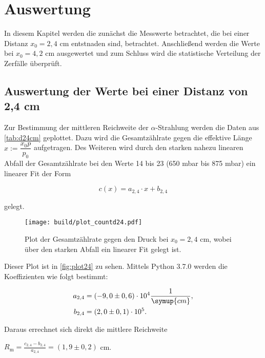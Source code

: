 \section{Auswertung}
\label{sec:Auswertung}

In diesem Kapitel werden die zunächst die Messwerte betrachtet, die bei einer Distanz $x_0 = 2,4$ cm entstnaden sind, betrachtet.
Anschließend werden die Werte bei $x_0 = 4,2$ cm ausgewertet und zum Schluss wird die statistische Verteilung der Zerfälle überprüft.

\subsection{Auswertung der Werte bei einer Distanz von 2,4 cm}

Zur Bestimmung der mittleren Reichweite der $\alpha$-Strahlung werden die Daten aus \autoref{tab:d24cm} geplottet.
Dazu wird die Gesamtzählrate gegen die effektive Länge $x := \dfrac{x_0 p}{p_0}$ aufgetragen.
Des Weiteren wird durch den starken nahezu linearen Abfall der Gesamtzählrate bei den Werte 14 bis 23 (650 mbar bis 875 mbar) ein linearer Fit der Form

\begin{equation}
    c(x) = a_{2,4} \cdot x + b_{2,4}
\end{equation}

gelegt.



\begin{figure}
    \centering
    \texttt{[image: build/plot\_countd24.pdf]}
    \caption{Plot der Gesamtzählrate gegen den Druck bei $x_0 = 2,4$ cm, wobei über den starken Abfall ein linearer Fit gelegt ist.}
    \label{fig:plot24}
\end{figure}

Dieser Plot ist in \autoref{fig:plot24} zu sehen.
Mittels Python 3.7.0 werden die Koeffizienten wie folgt bestimmt:

\begin{align}
    a_{2,4} &= (-9,0 \pm 0,6) \cdot 10^{4} \frac{1}{\symup{cm}},\\
    b_{2,4} &= (2,0 \pm 0,1) \cdot 10^{5}.
\end{align}

Daraus errechnet sich direkt die mittlere Reichweite 

\begin{center}
    $R_\text{m} = \frac{c_{2,4} - b_{2,4}}{a_{2,4}} = (1,9 \pm 0,2)$ cm.
\end{center}

